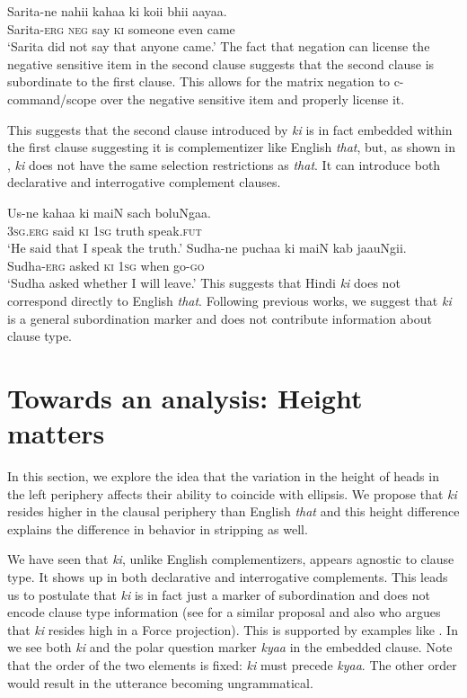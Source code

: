 \documentclass[output=paper]{langscibook}
\begin{document}
\ea \label{maex22}
    \gll Sarita-ne nahii kahaa ki koii bhii aayaa.\\
    Sarita-\textsc{erg} \textsc{neg} say \textsc{ki} someone even came\\
    \glt `Sarita did not say that anyone came.'
\z 
The fact that negation can license the negative sensitive item in the second clause suggests that the second clause is subordinate to the first clause. This allows for the matrix negation to c-command/scope over the negative sensitive item and properly license it.

This suggests that the second clause introduced by \emph{ki} is in fact embedded within the first clause suggesting it is complementizer like English \emph{that}, but, as shown in , \emph{ki} does not have the same selection restrictions as \emph{that}. It can introduce both declarative  and interrogative  complement clauses.

\ea \label{maex23}
    \ea \label{maex23:a}
        \gll Us-ne kahaa ki maiN sach boluNgaa.\\
        \textsc{3sg.erg} said \textsc{ki} \textsc{1sg} truth speak.\textsc{fut}\\
        \glt `He said that I speak the truth.'
    \ex \label{maex23:b}
        \gll Sudha-ne puchaa ki maiN kab jaauNgii.\\
        Sudha-\textsc{erg} asked \textsc{ki} \textsc{1sg} when go-\textsc{go}\\
        \glt `Sudha asked whether I will leave.'
    \z 
\z 
This suggests that Hindi \emph{ki} does not correspond directly to English \emph{that}. Following previous works, we suggest that \emph{ki} is a general subordination marker and does not contribute information about clause type. 

\section{Towards an analysis: Height matters}\label{mamasect3}
In this section, we explore the idea that the variation in the height of heads in the left periphery affects their ability to coincide with ellipsis. We propose that \emph{ki} resides higher in the clausal periphery than English \emph{that} and this height difference explains the difference in behavior in stripping as well.

We have seen that \emph{ki}, unlike English complementizers, appears agnostic to clause type. It shows up in both declarative and interrogative complements. This leads us to postulate that \emph{ki} is in fact just a marker of subordination and does not encode clause type information (see \citealt{bhatt91} for a similar proposal and also \citealt{davison03} who argues that \emph{ki} resides high in a Force projection). This is supported by examples like . In  we see both \emph{ki} and the polar question marker \emph{kyaa} in the embedded clause. Note that the order of the two elements is fixed: \emph{ki} must precede \emph{kyaa}. The other order would result in the utterance becoming ungrammatical.
\end{document}
